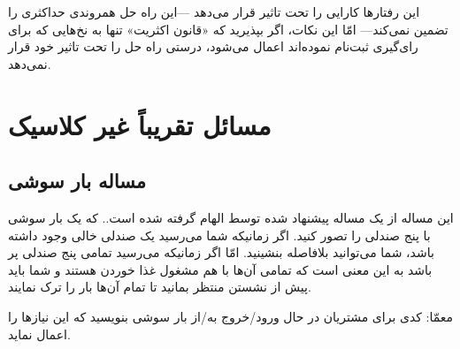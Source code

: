 \documentclass{book}
\newcommand{\clearemptydoublepage}{\newpage\cleardoublepage}
\begin{document}
    این رفتارها کارایی را تحت تاثیر قرار می‌دهد ---این راه حل همروندی حداکثری را تضمین نمی‌کند--- امّا این نکات،
    اگر بپذیرید که «قانون اکثریت»  تنها به نخ‌هایی که برای رای‌گیری ثبت‌نام نموده‌اند اعمال می‌شود، 
    درستی راه حل را تحت تاثیر خود قرار نمی‌دهد. 
    


\clearemptydoublepage
\chapter{مسائل تقریباً غیر کلاسیک}

\section{مساله بار سوشی}

    این مساله از یک مساله پیشنهاد شده توسط  الهام گرفته شده است.\cite{reek}. که یک بار سوشی با پنج صندلی را  تصور کنید.
    اگر زمانیکه شما می‌رسید یک صندلی خالی وجود داشته باشد، شما می‌توانید بلافاصله بنشینید. امّا اگر زمانیکه می‌رسید تمامی پنج صندلی پر باشد 
    به این معنی است که تمامی آن‌ها با هم مشغول غذا خوردن هستند و شما باید پیش از نشستن منتظر بمانید تا تمام آن‌ها بار را ترک نمایند. 
    

    معمّا: کدی برای مشتریان در حال ورود/خروج  به/از بار سوشی بنویسید که این نیازها را اعمال نماید. 

\clearemptydoublepage
\end{document}
